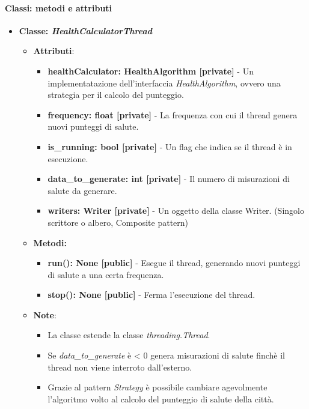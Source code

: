 \paragraph*{Classi: metodi e attributi}
\begin{itemize}
    \item{\textbf{Classe: \textit{HealthCalculatorThread}}}
    \begin{itemize}
    \item\textbf{Attributi}:
        \begin{itemize}
        \item \textbf{healthCalculator: HealthAlgorithm [private]} - Un implementatazione dell'interfaccia \textit{HealthAlgorithm}, ovvero una strategia per il calcolo del punteggio.
        \item \textbf{frequency: float [private]} - La frequenza con cui il thread genera nuovi punteggi di salute.
        \item \textbf{is\_running: bool [private]} - Un flag che indica se il thread è in esecuzione.
        \item \textbf{data\_to\_generate: int [private]} - Il numero di misurazioni di salute da generare.
        \item \textbf{writers: Writer [private]} - Un oggetto della classe Writer. (Singolo scrittore o albero, Composite pattern)
    \end{itemize}
    \item \textbf{Metodi: }
    \begin{itemize}
        \item \textbf{run(): None [public]} - Esegue il thread, generando nuovi punteggi di salute a una certa frequenza.
        \item \textbf{stop(): None [public]} - Ferma l'esecuzione del thread.
    \end{itemize}
    \item\textbf{Note}:
        \begin{itemize}
            \item La classe estende la classe \textit{threading.Thread}.
            \item Se \textit{data\_to\_generate} è < 0 genera misurazioni di salute finchè il thread non viene interroto dall'esterno.
            \item   Grazie al pattern \textit{Strategy} è possibile cambiare agevolmente l'algoritmo volto al calcolo del punteggio di salute della città.
        \end{itemize}
    \end{itemize}
\end{itemize}

